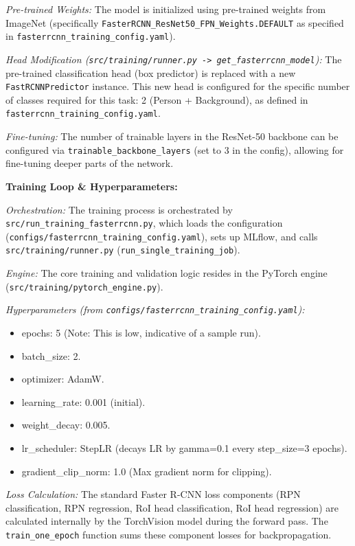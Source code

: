 \textit{Pre-trained Weights:} The model is initialized using pre-trained weights from ImageNet (specifically \texttt{FasterRCNN\_ResNet50\_FPN\_Weights.DEFAULT} as specified in \texttt{fasterrcnn\_training\_config.yaml}).

\textit{Head Modification (\texttt{src/training/runner.py -> get\_fasterrcnn\_model}):} The pre-trained classification head (box predictor) is replaced with a new \texttt{FastRCNNPredictor} instance. This new head is configured for the specific number of classes required for this task: 2 (Person + Background), as defined in \texttt{fasterrcnn\_training\_config.yaml}.

\textit{Fine-tuning:} The number of trainable layers in the ResNet-50 backbone can be configured via \texttt{trainable\_backbone\_layers} (set to 3 in the config), allowing for fine-tuning deeper parts of the network.

\textbf{Training Loop \& Hyperparameters:}

\textit{Orchestration:} The training process is orchestrated by \texttt{src/run\_training\_fasterrcnn.py}, which loads the configuration (\texttt{configs/fasterrcnn\_training\_config.yaml}), sets up MLflow, and calls \texttt{src/training/runner.py} (\texttt{run\_single\_training\_job}).

\textit{Engine:} The core training and validation logic resides in the PyTorch engine (\texttt{src/training/pytorch\_engine.py}).

\textit{Hyperparameters (from \texttt{configs/fasterrcnn\_training\_config.yaml}):}
\begin{itemize}
    \item epochs: 5 (Note: This is low, indicative of a sample run).
    \item batch\_size: 2.
    \item optimizer: AdamW.
    \item learning\_rate: 0.001 (initial).
    \item weight\_decay: 0.005.
    \item lr\_scheduler: StepLR (decays LR by gamma=0.1 every step\_size=3 epochs).
    \item gradient\_clip\_norm: 1.0 (Max gradient norm for clipping).
\end{itemize}

\textit{Loss Calculation:} The standard Faster R-CNN loss components (RPN classification, RPN regression, RoI head classification, RoI head regression) are calculated internally by the TorchVision model during the forward pass. The \texttt{train\_one\_epoch} function sums these component losses for backpropagation.

